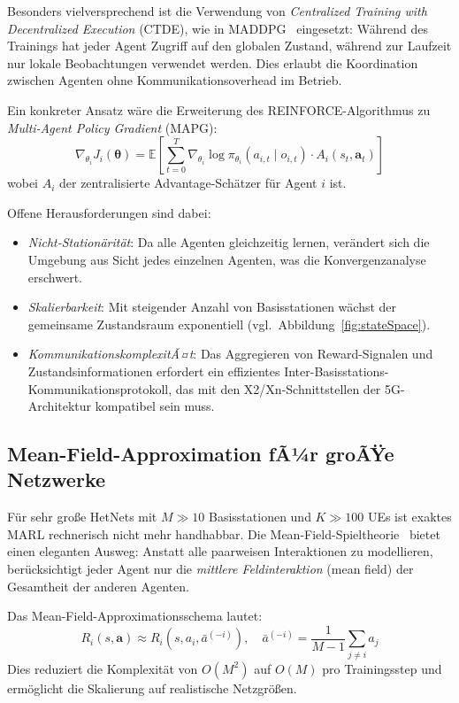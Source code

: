 ﻿\documentclass[a4paper,12pt]{article}
\theoremstyle{definition}
\begin{document}
Besonders vielversprechend ist die Verwendung von \emph{Centralized Training with
Decentralized Execution} (CTDE), wie in MADDPG~\cite{lowe2017} eingesetzt:
W\"ahrend des Trainings hat jeder Agent Zugriff auf den globalen Zustand, w\"ahrend
zur Laufzeit nur lokale Beobachtungen verwendet werden. Dies erlaubt die Koordination
zwischen Agenten ohne Kommunikationsoverhead im Betrieb.

Ein konkreter Ansatz w\"are die Erweiterung des REINFORCE-Algorithmus zu
\emph{Multi-Agent Policy Gradient} (MAPG):
\[
  \nabla_{\theta_i} J_i(\boldsymbol{\theta}) =
  \mathbb{E}\!\left[\sum_{t=0}^{T} \nabla_{\theta_i} \log \pi_{\theta_i}(a_{i,t} \mid o_{i,t})
  \cdot A_i(s_t, \mathbf{a}_t)\right]
\]
wobei $A_i$ der zentralisierte Advantage-Sch\"atzer f\"ur Agent $i$ ist.

Offene Herausforderungen sind dabei:
\begin{itemize}
  \item \emph{Nicht-Station\"arit\"at}: Da alle Agenten gleichzeitig lernen, ver\"andert sich die
    Umgebung aus Sicht jedes einzelnen Agenten, was die Konvergenzanalyse erschwert.
  \item \emph{Skalierbarkeit}: Mit steigender Anzahl von Basisstationen w\"achst
    der gemeinsame Zustandsraum exponentiell (vgl.\ Abbildung~\ref{fig:stateSpace}).
  \item \emph{KommunikationskomplexitÃ¤t}: Das Aggregieren von Reward-Signalen und
    Zustandsinformationen erfordert ein effizientes Inter-Basisstations-Kommunikationsprotokoll,
    das mit den X2/Xn-Schnittstellen der 5G-Architektur kompatibel sein muss.
\end{itemize}

\subsection{Mean-Field-Approximation fÃ¼r groÃŸe Netzwerke}

F\"ur sehr gro\ss{}e HetNets mit $M \gg 10$ Basisstationen und $K \gg 100$ UEs
ist exaktes MARL rechnerisch nicht mehr handhabbar. Die Mean-Field-Spieltheorie~\cite{yang2018}
bietet einen eleganten Ausweg: Anstatt alle paarweisen Interaktionen zu modellieren,
ber\"ucksichtigt jeder Agent nur die \emph{mittlere Feldinteraktion} (mean field) der
Gesamtheit der anderen Agenten.

Das Mean-Field-Approximationsschema lautet:
\[
  R_i(s, \mathbf{a}) \approx R_i\!\left(s, a_i, \bar{a}^{(-i)}\right), \quad
  \bar{a}^{(-i)} = \frac{1}{M-1} \sum_{j \neq i} a_j
\]
Dies reduziert die Komplexit\"at von $O(M^2)$ auf $O(M)$ pro Trainingsstep und
erm\"oglicht die Skalierung auf realistische Netzgr\"o\ss{}en.
\end{document}
